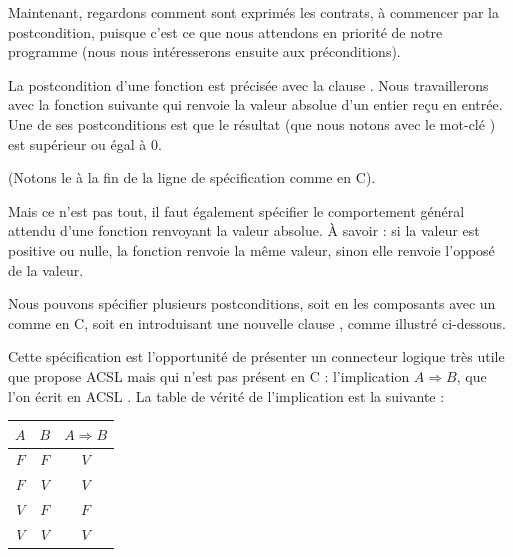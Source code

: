 Maintenant, regardons comment sont exprimés les contrats, à commencer par la
postcondition, puisque c'est ce que nous attendons en priorité de notre
programme (nous nous intéresserons ensuite aux préconditions).





La postcondition d'une fonction est précisée avec la clause .
Nous travaillerons avec la fonction suivante qui renvoie la valeur absolue
d'un entier reçu en entrée.
Une de ses postconditions est que le résultat (que nous notons avec le
mot-clé ) est supérieur ou égal à 0.






(Notons le \CodeInline{;} à la fin de la ligne de spécification comme en C).



Mais ce n'est pas tout, il faut également spécifier le comportement général
attendu d'une fonction renvoyant la valeur absolue. À savoir : si la valeur
est positive ou nulle, la fonction renvoie la même valeur, sinon elle renvoie
l'opposé de la valeur.



Nous pouvons spécifier plusieurs postconditions, soit en les composants avec
un \CodeInline{\&\&} comme en C, soit en introduisant une nouvelle clause ,
comme illustré ci-dessous.






Cette spécification est l'opportunité de présenter un connecteur logique
très utile que propose ACSL mais qui n'est pas présent en C :
l'implication $A \Rightarrow B$, que l'on écrit en ACSL .
La table de vérité de l'implication est la suivante :



\begin{longtabu}{|c|c|c|} \hline
$A$ & $B$ & $A \Rightarrow B$ \\ \hline
$F$ & $F$ & $V$ \\ \hline
$F$ & $V$ & $V$ \\ \hline
$V$ & $F$ & $F$ \\ \hline
$V$ & $V$ & $V$ \\ \hline
\end{longtabu}



